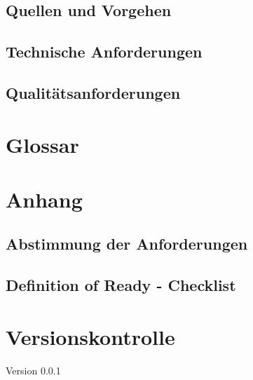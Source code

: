 \documentclass[a4paper,10pt]{report}
\begin{document}
\subsection{Quellen und Vorgehen}
\subsection{Technische Anforderungen}
\subsection{Qualitätsanforderungen}
\section{Glossar}
\listoffigures
\listoftables

\section{Anhang}

\subsection{Abstimmung der Anforderungen}
\subsection{Definition of Ready - Checklist}
\section{Versionskontrolle}
Version 0.0.1
\end{document}
